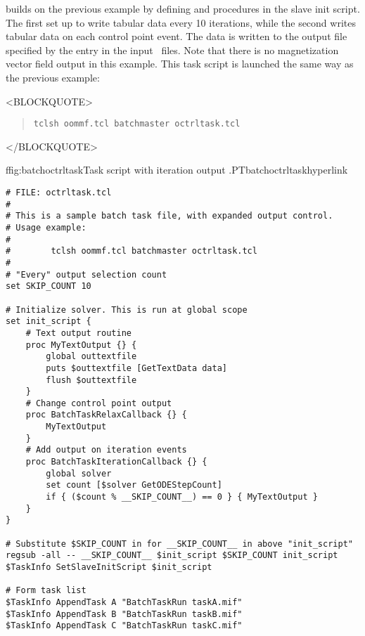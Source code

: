 builds on the previous example by
defining  and
 procedures in the slave init script.
The first set up to write tabular data every 10 iterations, while the
second writes tabular data on each control point event.  The data is
written to the output file specified by the 
entry in the input \MIF\ files.  Note that there is no magnetization
vector field output in this example.  This task script is launched the
same way as the previous example:
\begin{rawhtml}
<BLOCKQUOTE>
\end{rawhtml}
\begin{quote}
\begin{verbatim}
tclsh oommf.tcl batchmaster octrltask.tcl
\end{verbatim}
\end{quote}
\begin{rawhtml}
</BLOCKQUOTE>
\end{rawhtml}

\begin{codelisting}{f}{fig:batchoctrltask}{Task script with
  iteration output .}{PTbatchoctrltask}{hyperlink}
\begin{verbatim}
# FILE: octrltask.tcl
#
# This is a sample batch task file, with expanded output control.
# Usage example:
#
#        tclsh oommf.tcl batchmaster octrltask.tcl
#
# "Every" output selection count
set SKIP_COUNT 10

# Initialize solver. This is run at global scope
set init_script {
    # Text output routine
    proc MyTextOutput {} {
        global outtextfile
        puts $outtextfile [GetTextData data]
        flush $outtextfile
    }
    # Change control point output
    proc BatchTaskRelaxCallback {} {
        MyTextOutput
    }
    # Add output on iteration events
    proc BatchTaskIterationCallback {} {
        global solver
        set count [$solver GetODEStepCount]
        if { ($count % __SKIP_COUNT__) == 0 } { MyTextOutput }
    }
}

# Substitute $SKIP_COUNT in for __SKIP_COUNT__ in above "init_script"
regsub -all -- __SKIP_COUNT__ $init_script $SKIP_COUNT init_script
$TaskInfo SetSlaveInitScript $init_script

# Form task list
$TaskInfo AppendTask A "BatchTaskRun taskA.mif"
$TaskInfo AppendTask B "BatchTaskRun taskB.mif"
$TaskInfo AppendTask C "BatchTaskRun taskC.mif"
\end{verbatim}
\end{codelisting}

